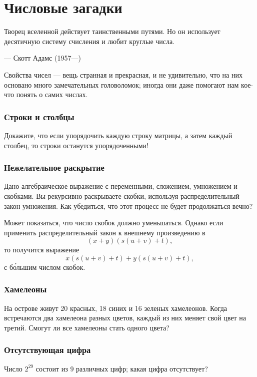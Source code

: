 \chapter{Числовые загадки}


\setlength{\epigraphwidth}{.80\textwidth}
\epigraph{Творец вселенной действует таинственными путями.
Но он использует десятичную систему счисления и любит круглые
числа.
}{--- Скотт Адамс (1957---)}


Свойства чисел --- вещь странная и прекрасная, и не удивительно, что на них основано много замечательных головоломок; иногда они даже помогают нам кое-что понять о самих числах.

\subsection*{Строки и столбцы}

Докажите, что если упорядочить каждую строку матрицы, а затем каждый столбец, то строки останутся упорядоченными!

\subsection*{Нежелательное раскрытие}

Дано алгебраическое выражение с переменными, сложением, умножением и скобками.
Вы рекурсивно раскрываете скобки, используя распределительный закон умножения.
Как убедиться, что этот процесс не будет продолжаться вечно?

Может показаться, что число скобок должно уменьшаться.
Однако если применить распределительный закон к внешнему произведению в
\[(x + y)(s(u + v) + t),\]
то получится выражение
\[x(s(u + v) + t) + y(s(u + v) + t),\]
с б\'{о}льшим числом скобок.

\subsection*{Хамелеоны}

На острове живут 20 красных, 18 синих и 16 зеленых хамелеонов.
Когда встречаются два хамелеона разных цветов, каждый из них меняет свой цвет на третий.
Смогут ли все хамелеоны стать одного цвета?

\subsection*{Отсутствующая цифра}

Число $2^{29}$ состоит из $9$ различных цифр; какая цифра отсутствует?

